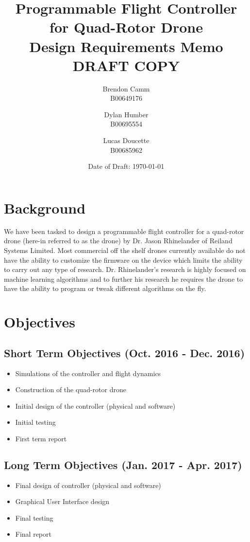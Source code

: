 \documentclass[draft]{article}
\title{Programmable Flight Controller for Quad-Rotor Drone \\ Design Requirements Memo \\ DRAFT COPY}
\author{Brendon Camm \\ B00649176 \and Dylan Humber \\ B00695554	\and Lucas Doucette \\ B00685962}
\date{Date of Draft: \today}
\begin{document}
\maketitle

\section{Background}
We have been tasked to design a programmable flight controller for a quad-rotor drone (here-in referred to as the drone) by Dr. Jason Rhinelander of Reiland Systems Limited. Most commercial off the shelf drones currently available do not have the ability to customize the firmware on the device which limits the ability to carry out any type of research. Dr. Rhinelander’s research is highly focused on machine learning algorithms and to further his research he requires the drone to have the ability to program or tweak different algorithms on the fly. 
\section{Objectives}
\subsection{Short Term Objectives (Oct. 2016 - Dec. 2016)}
\begin{itemize}
	\item Simulations of the controller and flight dynamics 
	\item Construction of the quad-rotor drone
	\item Initial design of the controller (physical and software)
	\item Initial testing
	\item First term report
\end{itemize}
\subsection{Long Term Objectives (Jan. 2017 - Apr. 2017)}
\begin{itemize}
	\item Final design of controller (physical and software)
	\item Graphical User Interface design
	\item Final testing 
	\item Final report
\end{itemize}
\end{document}
